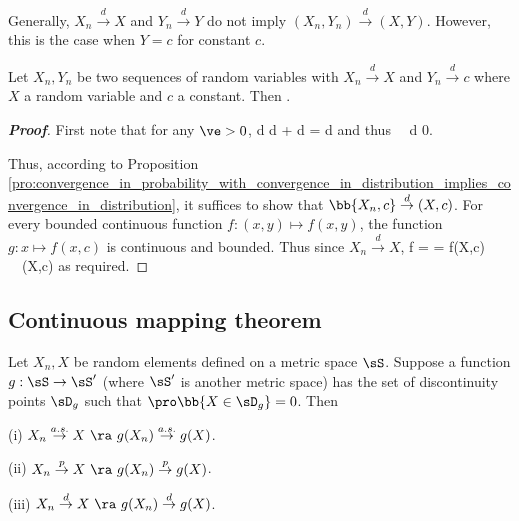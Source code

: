 Generally, $X_n \stackrel{d}{\to }X$ and $Y_n \stackrel{d}{\to }Y$ do not imply $(X_n,Y_n) \stackrel{d}{\to }(X,Y)$. However, this is the case when $Y = c$ for constant $c$.


\begin{proposition}\label{pro:joint_convergence_in_distribution_constant}
Let $X_n,Y_n$ be two sequences of random variables with $X_n \stackrel{d}{\to }X$ and $Y_n \stackrel{d}{\to}c$ where $X$ a random variable and $c$ a constant. Then
\be
{}  .
\ee
\end{proposition}

\begin{proof}[\bf Proof]%
First note that for any $\ve>0$,
\be
d \leq d + d = d
\ee
and thus
\be
\pro{} \leq \pro{}  \ \ra\  d  0.
\ee

Thus, according to Proposition \ref{pro:convergence_in_probability_with_convergence_in_distribution_implies_convergence_in_distribution},
it suffices to show that $\bb{X_n,c}\stackrel{d}{\to}(X,c)$. For every bounded continuous function $f: (x,y)\mapsto f(x,y)$, the function $g:x\mapsto f(x,c)$ is continuous and bounded. Thus since $X_n \stackrel{d}{\to} X$,
\be
\E f = \E{} \to \E{} = \E f(X,c) \ \ra\ (X,c)
\ee
as required.
\end{proof}





\subsection{Continuous mapping theorem}


\begin{theorem}\label{thm:continuous_mapping_probability}
Let $X_n,X$ be random elements defined on a metric space $\sS$. Suppose a function $g: \sS\to \sS'$ (where $\sS'$ is another metric space) has the set of discontinuity points $\sD_g$ such that $\pro\bb{X\in \sD_g} = 0$. Then
\ben
\item [(i)]  $X_{n} \stackrel{a.s.}{\to} X \ \ra\  g(X_{n})\stackrel{a.s.}{\to} g(X)$.
\item [(ii)] $X_{n} \stackrel{p}{\to} X \ \ra\  g(X_{n})\stackrel{p}{\to} g(X)$.
\item [(iii)] $X_{n} \stackrel{d}{\to} X \ \ra\  g(X_{n})\stackrel{d}{\to} g(X)$.
\een
\end{theorem}


